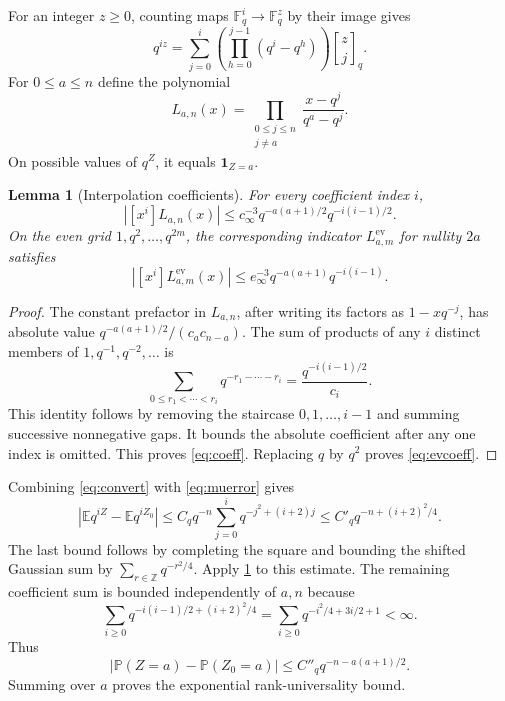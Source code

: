 \documentclass[11pt]{article}
\newtheorem{lemma}[theorem]{Lemma}
\theoremstyle{definition}\newtheorem{definition}[theorem]{Definition}
\theoremstyle{remark}\newtheorem{remark}[theorem]{Remark}
\newcommand{\F}{\mathbb F}
\newcommand{\E}{\mathbb E}
\newcommand{\Prob}{\mathbb P}
\newcommand{\gb}[2]{\genfrac{[}{]}{0pt}{}{#1}{#2}_{q}}
\newcommand{\1}{\mathbf 1}
\begin{document}
For an integer $z\ge0$, counting maps $\F_q^i\to\F_q^z$ by their image gives
\begin{equation}\label{eq:convert}
 q^{iz}=\sum_{j=0}^{i}\left(\prod_{h=0}^{j-1}(q^i-q^h)\right)\gb zj.
\end{equation}
For $0\le a\le n$ define the polynomial
\[
 L_{a,n}(x)=\prod_{\substack{0\le j\le n\\j\ne a}}
                 \frac{x-q^j}{q^a-q^j}.
\]
On possible values of $q^Z$, it equals $\1_{Z=a}$.

\begin{lemma}[Interpolation coefficients]\label{lem:coeff}
For every coefficient index $i$,
\begin{equation}\label{eq:coeff}
 |[x^i]L_{a,n}(x)|
 \le c_\infty^{-3}q^{-a(a+1)/2}q^{-i(i-1)/2}.
\end{equation}
On the even grid $1,q^2,\ldots,q^{2m}$, the corresponding indicator
$L^{\mathrm{ev}}_{a,m}$ for nullity $2a$ satisfies
\begin{equation}\label{eq:evcoeff}
 |[x^i]L^{\mathrm{ev}}_{a,m}(x)|
 \le e_\infty^{-3}q^{-a(a+1)}q^{-i(i-1)}.
\end{equation}
\end{lemma}

\begin{proof}
The constant prefactor in $L_{a,n}$, after writing its factors as
$1-xq^{-j}$, has absolute value
$q^{-a(a+1)/2}/(c_a c_{n-a})$. The sum of products of any $i$ distinct
members of $1,q^{-1},q^{-2},\ldots$ is
\[
 \sum_{0\le r_1<\cdots<r_i}q^{-r_1-\cdots-r_i}
    =\frac{q^{-i(i-1)/2}}{c_i}.
\]
This identity follows by removing the staircase $0,1,\ldots,i-1$ and
summing successive nonnegative gaps. It bounds the absolute coefficient
after any one index is omitted. This proves \eqref{eq:coeff}. Replacing
$q$ by $q^2$ proves \eqref{eq:evcoeff}.
\end{proof}

Combining \eqref{eq:convert} with \eqref{eq:muerror} gives
\begin{equation}\label{eq:powererror}
 |\E q^{iZ}-\E q^{iZ_0}|
 \le C_q q^{-n}\sum_{j=0}^{i}q^{-j^2+(i+2)j}
 \le C'_q q^{-n+(i+2)^2/4}.
\end{equation}
The last bound follows by completing the square and bounding the shifted
Gaussian sum by $\sum_{r\in\mathbb Z}q^{-r^2/4}$.
Apply \cref{lem:coeff} to this estimate. The remaining coefficient sum is
bounded independently of $a,n$ because
\[
 \sum_{i\ge0}q^{-i(i-1)/2+(i+2)^2/4}
 =\sum_{i\ge0}q^{-i^2/4+3i/2+1}<\infty.
\]
Thus
\begin{equation}\label{eq:rankmassbound}
 |\Prob(Z=a)-\Prob(Z_0=a)|
       \le C''_q q^{-n-a(a+1)/2}.
\end{equation}
Summing over $a$ proves the exponential rank-universality bound.
\end{document}

